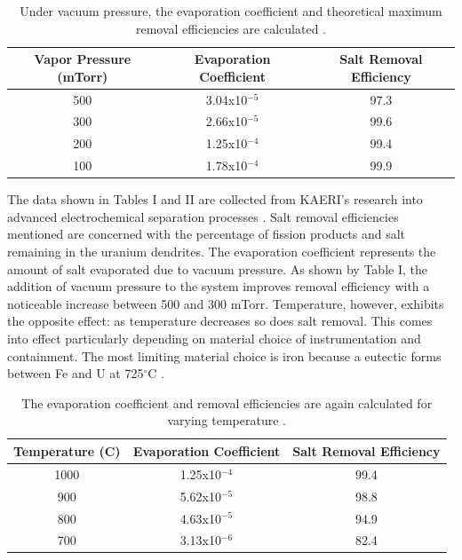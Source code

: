 \documentclass{anstrans}
\begin{document}
\begin{table}[h]
	\centering
	\begin{tabularx}{0.5\textwidth}{ccc}
		\hline
		\textbf{Vapor Pressure (mTorr)} & \textbf{Evaporation Coefficient} & \textbf{Salt Removal Efficiency} \\
		\hline
		500 & 3.04x10$^{-5}$ & 97.3 \\
		300 & 2.66x10$^{-5}$ & 99.6 \\
		200 & 1.25x10$^{-4}$ & 99.4 \\
		100 & 1.78x10$^{-4}$ & 99.9 \\
		\hline
	\end{tabularx}
	\caption {Under vacuum pressure, the evaporation coefficient and theoretical maximum removal efficiencies are calculated \cite{lee_advanced_nodate}.}
	\label {tab:pressure}
\end{table}

The data shown in Tables I and II are collected from KAERI's research into advanced electrochemical separation processes \cite{lee_advanced_nodate}. Salt removal efficiencies mentioned are concerned with the percentage of fission products and salt remaining in the uranium dendrites. The evaporation coefficient represents the amount of salt evaporated due to vacuum pressure. 
As shown by Table I, the addition of vacuum pressure to the system improves removal efficiency with a noticeable increase between 500 and 300 mTorr. Temperature, however, exhibits the opposite effect: as temperature decreases so does salt removal. This comes into effect particularly depending on material choice of instrumentation and containment. The most limiting material choice is iron because a eutectic forms between Fe and U at 725$^{\circ}$C \cite{chapman_revision_1984}.

\begin{table}[h]
	\centering
	\begin{tabularx}{0.5\textwidth}{ccc}
		\hline
		\textbf{Temperature (C)} & \textbf{Evaporation Coefficient} & \textbf{Salt Removal Efficiency} \\
		\hline
		1000 & 1.25x10$^{-4}$ & 99.4 \\
		900 & 5.62x10$^{-5}$ & 98.8 \\
		800 & 4.63x10$^{-5}$ & 94.9 \\
		700 & 3.13x10$^{-6}$ & 82.4 \\
		\hline
	\end{tabularx}
	\caption {The evaporation coefficient and removal efficiencies are again calculated for varying temperature \cite{lee_advanced_nodate}.}
	\label {tab:temperature}
\end{table}
\end{document}
